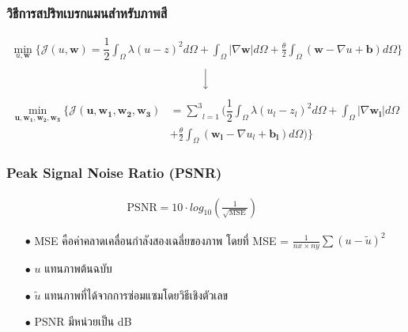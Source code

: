 \documentclass[xcolor=dvipsnames, xetex,serif]{beamer}
\numberwithin{equation}{section}
\begin{document}
    \begin{frame}
    \frametitle{วิธีการสปริทเบรกแมนสำหรับภาพสี}
        \begin{align*}
        \min_{u,\boldsymbol{w}} \{ \mathcal{J}(u,\boldsymbol{w}) = \dfrac{1}{2} \int_{\Omega} \lambda(u-z)^2 d\Omega +  \int_{\Omega}  |\nabla \boldsymbol{w}|  d\Omega + \frac{\theta}{2} \int_{\Omega} (\boldsymbol{w} - \nabla u + \boldsymbol{b}) d\Omega \}
        \end{align*}
        \begin{align*}
        \Big \downarrow
        \end{align*}
        \begin{align*}
        \min_{\boldsymbol{u},\boldsymbol{w_1},\boldsymbol{w_2},\boldsymbol{w_3}} \{ \mathcal{J}(\boldsymbol{u},\boldsymbol{w_1},\boldsymbol{w_2},\boldsymbol{w_3}) &= \underset{l=1}{\overset{3}{\sum}} (  \dfrac{1}{2} \int_{\Omega} \lambda(u_l-z_l)^2 d\Omega +  \int_{\Omega}  |\nabla \boldsymbol{w_l}|  d\Omega \\ &+ \frac{\theta}{2} \int_{\Omega} (\boldsymbol{w_l} - \nabla u_l+ \boldsymbol{b_l}) d\Omega ) \}
        \end{align*}
    \end{frame}
    \begin{frame}
        \frametitle{Peak Signal Noise Ratio (PSNR)}
        \begin{align*}
        \text{PSNR}  = 10 \cdot log_{10} ( \frac{1}{\sqrt{\text{MSE}}} )  \hspace{1cm}
        \end{align*}
        \begin{itemize}
            \item[$\bullet$] MSE คือค่าคลาดเคลื่อนกำลังสองเฉลี่ยของภาพ โดยที่ MSE = $\frac{1}{nx \times ny} \sum (u - \tilde{u})^2 $
            \item[$\bullet$] $u$ แทนภาพต้นฉบับ
            \item[$\bullet$] $\tilde{u}$  แทนภาพที่ได้จากการซ่อมแซมโดยวิธีเชิงตัวเลข
            \item[$\bullet$] PSNR มีหน่วยเป็น dB
        \end{itemize}
    \end{frame}
\end{document}
